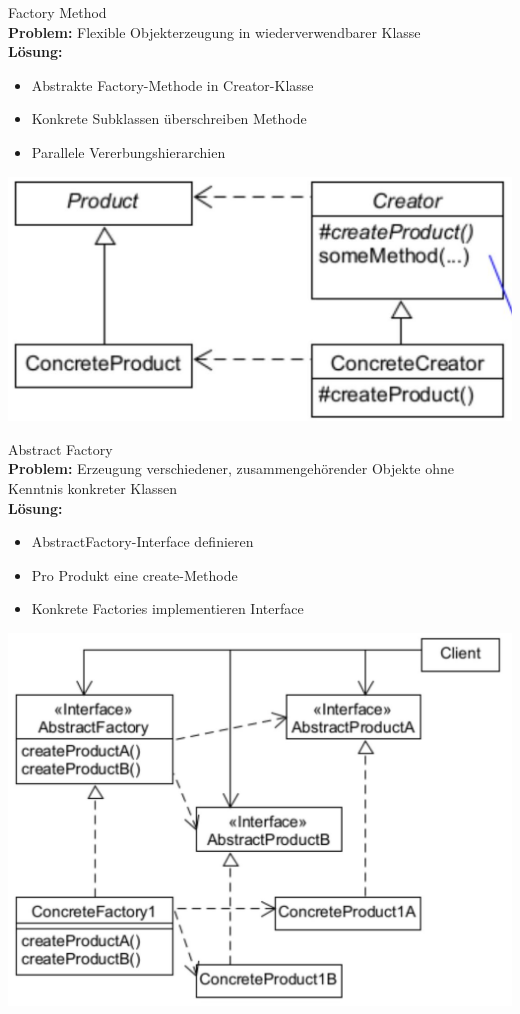 \begin{concept}{Factory Method}\\
\textbf{Problem:} Flexible Objekterzeugung in wiederverwendbarer Klasse\\
\textbf{Lösung:}
\begin{itemize}
    \item Abstrakte Factory-Methode in Creator-Klasse
    \item Konkrete Subklassen überschreiben Methode
    \item Parallele Vererbungshierarchien
\end{itemize}
\includegraphics[width=0.6\linewidth]{images/2025_01_02_73d93f10fa91ab6123dcg-16}
\end{concept}

\begin{concept}{Abstract Factory}\\
\textbf{Problem:} Erzeugung verschiedener, zusammengehörender Objekte ohne Kenntnis konkreter Klassen\\
\textbf{Lösung:}
\begin{itemize}
    \item AbstractFactory-Interface definieren
    \item Pro Produkt eine create-Methode
    \item Konkrete Factories implementieren Interface
\end{itemize}
\includegraphics[width=0.8\linewidth]{images/2025_01_02_73d93f10fa91ab6123dcg-13}
\end{concept}


